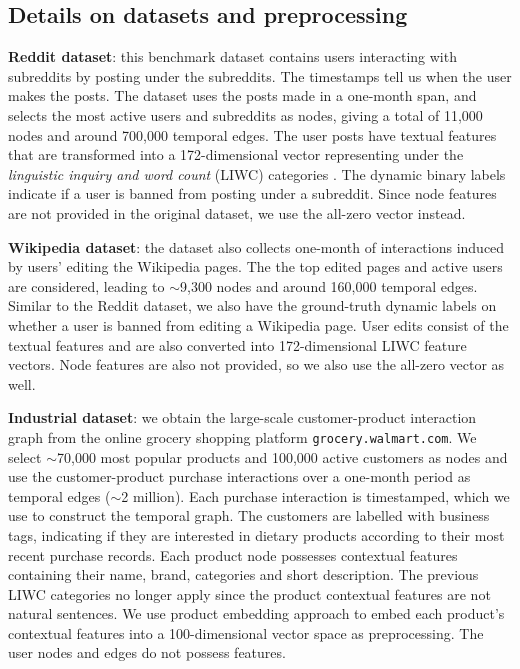 \documentclass{article} %
\begin{document}
\subsection{Details on datasets and preprocessing}

\textbf{Reddit dataset}: this benchmark dataset contains users interacting with subreddits by posting under the subreddits. The timestamps tell us when the user makes the posts. The dataset uses the posts made in a one-month span, and selects the most active users and subreddits as nodes, giving a total of 11,000 nodes and around 700,000 temporal edges. The user posts have textual features that are transformed into a 172-dimensional vector representing under the \emph{linguistic inquiry and word count} (LIWC) categories \citep{pennebaker2001linguistic}. The dynamic binary labels indicate if a user is banned from posting under a subreddit. Since node features are not provided in the original dataset, we use the all-zero vector instead.

\textbf{Wikipedia dataset}: the dataset also collects one-month of interactions induced by users' editing the Wikipedia pages. The the top edited pages and active users are considered, leading to $\sim$9,300 nodes and around 160,000 temporal edges. Similar to the Reddit dataset, we also have the ground-truth dynamic labels on whether a user is banned from editing a Wikipedia page. User edits consist of the textual features and are also converted into 172-dimensional LIWC feature vectors. Node features are also not provided, so we also use the all-zero vector as well.

\textbf{Industrial dataset}: we obtain the large-scale customer-product interaction graph from the online grocery shopping platform \texttt{grocery.walmart.com}. We select $\sim$70,000 most popular products and 100,000 active customers as nodes and use the customer-product purchase interactions over a one-month period as temporal edges ($\sim$2 million). Each purchase interaction is timestamped, which we use to construct the temporal graph. The customers are labelled with business tags, indicating if they are interested in dietary products according to their most recent purchase records. Each product node possesses contextual features containing their name, brand, categories and short description. The previous LIWC categories no longer apply since the product contextual features are not natural sentences. We use product embedding approach \citep{xu2020product} to embed each product's contextual features into a 100-dimensional vector space as preprocessing. The user nodes and edges do not possess features.
\end{document}
